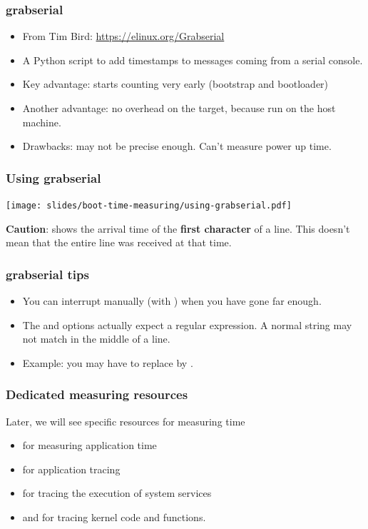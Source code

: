 \begin{frame}
\frametitle{grabserial}
\begin{itemize}
\item From Tim Bird: \url{https://elinux.org/Grabserial}
\item A Python script to add timestamps to messages coming from a
	serial console.
\item Key advantage: starts counting very early (bootstrap and bootloader)
\item Another advantage: no overhead on the target, because run on the host machine.
\item Drawbacks: may not be precise enough. Can't measure power up time.
\end{itemize}
\end{frame}

\begin{frame}
\frametitle{Using grabserial}
\begin{center}
    \texttt{[image: slides/boot-time-measuring/using-grabserial.pdf]}
\end{center}
{\small
{\bf Caution}:  shows the arrival time of the
{\bf first character} of a line. This doesn't mean that the entire line
was received at that time.}
\end{frame}

\begin{frame}
\frametitle{grabserial tips}
\begin{itemize}
  \item You can interrupt  manually (with
  \code{[Ctrl][c]}) when you have gone far enough.
  \item The  and  options actually expect a regular expression.
  A normal string may not match in the middle of a line.
  \item Example: you may have to replace  by
  .
\end{itemize}
\end{frame}

\begin{frame}
\frametitle{Dedicated measuring resources}
Later, we will see specific resources for measuring time
\begin{itemize}
  \item {} for measuring application time
  \item {} for application tracing
  \item {} for tracing the execution of system services
  \item {} and  for
        tracing kernel code and functions.
\end{itemize}
\end{frame}


